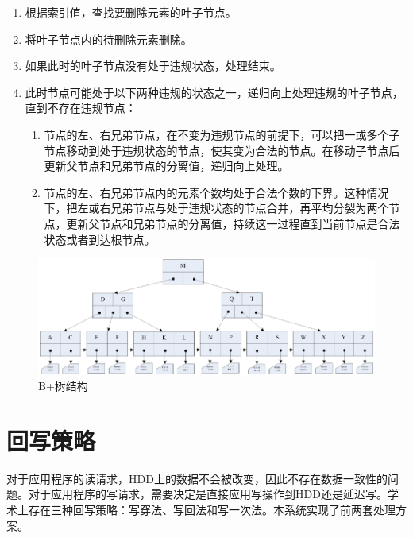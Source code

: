 \begin{itemize}
\begin{enumerate}
\item 根据索引值，查找要删除元素的叶子节点。
\item 将叶子节点内的待删除元素删除。
\item 如果此时的叶子节点没有处于违规状态，处理结束。
\item 此时节点可能处于以下两种违规的状态之一，递归向上处理违规的叶子节点，直到不存在违规节点：
\begin{enumerate}
\item 节点的左、右兄弟节点，在不变为违规节点的前提下，可以把一或多个子节点移动到处于违规状态的节点，使其变为合法的节点。在移动子节点后更新父节点和兄弟节点的分离值，递归向上处理。
\item 节点的左、右兄弟节点内的元素个数均处于合法个数的下界。这种情况下，把左或右兄弟节点与处于违规状态的节点合并，再平均分裂为两个节点，更新父节点和兄弟节点的分离值，持续这一过程直到当前节点是合法状态或者到达根节点。
\end{enumerate}
\end{enumerate}

\end{itemize}

\begin{figure}[H]
\centering
\includegraphics[width=1\linewidth]{./graph/bplus-tree}
\caption{B+树结构}
\label{fig:bplus-tree}
\end{figure}

\section{回写策略}
\label{sec:wb_strategy}

对于应用程序的读请求，HDD上的数据不会被改变，因此不存在数据一致性的问题。对于应用程序的写请求，需要决定是直接应用写操作到HDD还是延迟写。学术上存在三种回写策略：写穿法、写回法和写一次法。本系统实现了前两套处理方案。

